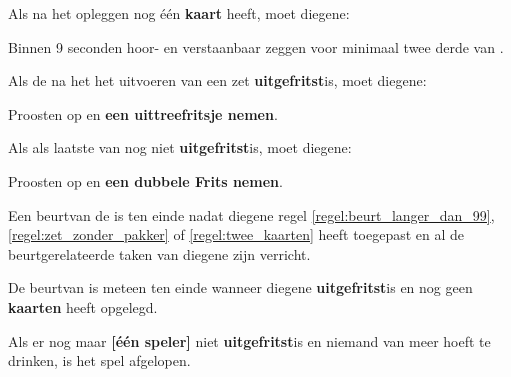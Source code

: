 \newpage
{}
\label{sec:beurten_en_zetten_einde}


\vervolgLijst{}
\item Als \eenSpeler na het opleggen nog \'e\'en \textbf{kaart} heeft, moet diegene:
\puntLijst{}
\item Binnen 9 seconden hoor- en verstaanbaar  zeggen voor minimaal twee derde van \alleSpelersN.
\eindPuntLijst{}
\label{regel:laatste_frits_1}
\eindLijst{}

\vervolgLijst{}
\item Als de \huidigeSpeler na het het uitvoeren van een zet \textbf{uitgefritst}\footnotemark[2] is, moet diegene:
\puntLijst{}
\item Proosten op  en \textbf{een uittreefritsje nemen}\footnotemark[3].
\eindPuntLijst{}
\label{regel:laatste_frits_2}
\eindLijst{}

\vervolgLijst{}
\item Als \eenSpeler als laatste van \alleSpelers nog niet \textbf{uitgefritst}\footnotemark[2] is, moet diegene:
\puntLijst{}
\item Proosten op  en \textbf{een dubbele Frits nemen}\footnotemark[4].
\eindPuntLijst{}
\eindLijst{}


\vervolgLijst{}
\item Een beurt\footnotemark[1] van de \huidigeSpeler is ten einde nadat diegene regel \ref{regel:beurt_langer_dan_99}, \ref{regel:zet_zonder_pakker} of \ref{regel:twee_kaarten} heeft toegepast en al de beurtgerelateerde taken van diegene zijn verricht.
\eindLijst{}

\vervolgLijst{}
\item De beurt\footnotemark[1] van \eenSpeler is meteen ten einde wanneer diegene \textbf{uitgefritst}\footnotemark[2] is en nog geen \textbf{kaarten} heeft opgelegd.
\eindLijst{}

\vervolgLijst{}
\item Als er nog maar \textbf{[\'e\'en speler]} niet \textbf{uitgefritst}\footnotemark[2] is en niemand van \alleSpelers meer hoeft te drinken, is het spel afgelopen.
\eindLijst{}

